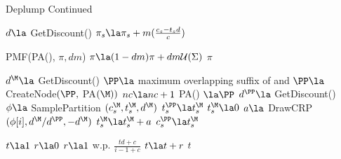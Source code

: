 \begin{algorithm}
	\begin{algorithmic}[1]
	\caption{Deplump Continued}

		\State $d \la $ GetDiscount(\N)		
				\State $\pi_s\la \pi_s + m(\frac{c_s - t_s d}{c})$
			\EndFor
		\EndIf
		
			\State \Return PMF(PA(\N), $\pi, d m$)
		\Else
			\State $\pi \la (1- d m)\pi + dm\mathcal{U}(\Sigma)$ 
			\State \Return $\pi$
		\EndIf 
	\EndFunction
	
		\State $d^\M \la$ GetDiscount(\M)
		\State $\PP \la$ maximum overlapping suffix  of \M \space and \Seq
		\State $\PP \la $ CreateNode$(\PP,$ PA$(\M))$
		\State $nc \la nc + 1$
		\State PA(\M) $\la \PP$
		\State $d^\PP \la$ GetDiscount(\PP)
			\State $\phi \la$ SamplePartition $(c^\M_s, t^\M_s,d^\M)$
			\State $t^\PP_s \la t^\M_s$
			\State $t^\M_s \la 0$
				\State $a \la$ DrawCRP$(\phi[i],d^\M / d^\PP,-d^\M)$
				\State $t_s^\M \la t_s^\M + a$
			\EndFor
			\State $c^\PP_s \la t^\M_s$
		\EndFor
		\State \Return \PP
	\EndFunction
	
	 
		\State $t \la 1$
			\State $r \la 0$
			\State $r  \la 1$ w.p. $\frac{td + c}{i-1 + c}$
			\State $t \la t + r$
		\EndFor
		\State \Return $t$
	\EndFunction
	
	\end{algorithmic}	
\end{algorithm}

